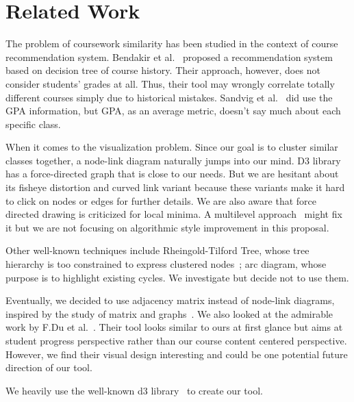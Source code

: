 \section{Related Work}
\label{sec:related}

The problem of coursework similarity has been studied in the context of course recommendation system. Bendakir et al.~\cite{bendakir2006using} proposed a recommendation system based on decision tree of course history. Their approach, however, does not consider students' grades at all. Thus, their tool may wrongly correlate totally different courses simply due to historical mistakes. Sandvig et al.~\cite{sandvig2005aacorn} did use the GPA information, but GPA, as an average metric, doesn't say much about each specific class. 

When it comes to the visualization problem. Since our goal is to cluster similar classes together, a node-link diagram naturally jumps into our mind. D3 library has a force-directed graph that is close to our needs. But we are hesitant about its fisheye distortion and curved link variant because these variants make it hard to click on nodes or edges for further details. We are also aware that force directed drawing is criticized for local minima. A multilevel approach~\cite{walshaw2000multilevel} might fix it but we are not focusing on algorithmic style improvement in this proposal.

Other well-known techniques include Rheingold-Tilford Tree, whose tree hierarchy is too constrained to express clustered nodes~\cite{Reingold:1981:TDT:1313316.1313481}; arc diagram, whose purpose is to highlight existing cycles. We investigate but decide not to use them. 

Eventually, we decided to use adjacency matrix instead of node-link diagrams, inspired by the study of matrix and graphs~\cite{Ghoniem:2004:CRG:1038262.1038777,VanHam:2003:UMC:1947368.1947409}. We also looked at the admirable work by F.Du et al.~\cite{du2016vis}. Their tool looks similar to ours at first glance but aims at student progress perspective rather than our course content centered perspective. However, we find their visual design interesting and could be one potential future direction of our tool.

We heavily use the well-known d3 library~\cite{Bostock:2011:DDD:2068462.2068631} to create our tool.
